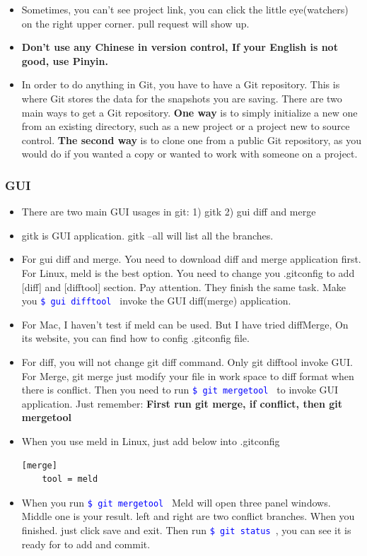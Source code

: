 \documentclass[a4paper,12pt,twoside]{book}
\newcommand{\linuxcommand}[1]{\texttt{\textcolor{blue}{\$ #1 \Pisymbol{psy}{191}}}}
\begin{document}
\begin{itemize}
\begin{itemize}
\begin{itemize}
    \item Sometimes, you can't see project link, you can click the little eye(watchers) on the right upper corner. pull request will show up.

\item \textbf{Don't use any Chinese in version control, If your English is not good, use
    Pinyin.}
    
\item In order to do anything in Git, you have to have a Git repository. This is where Git
    stores the data for the snapshots you are saving. There are two main ways to get a
    Git repository. \textbf{One way} is to simply initialize a new one from an existing
    directory, such as a new project or a project new to source control. \textbf{The
    second way} is to clone one from a public Git repository, as you would do if you
    wanted a copy or wanted to work with someone on a project.
\end{itemize}

\subsubsection{GUI}
\begin{itemize}
	\item There are two main GUI usages in git: 1) gitk 2) gui diff and merge    
    \item gitk is GUI application. gitk --all will list all the branches.
    \item For gui diff and merge.  You need to download diff and merge application first. For Linux, meld is the best option. You need to change you .gitconfig to add [diff] and [difftool] section. Pay attention. They finish the same task. Make you \linuxcommand{gui difftool} invoke the GUI diff(merge) application.  
       
      \item For Mac, I haven't test if meld can be used. But I have tried diffMerge, On its website, you can find how to config .gitconfig file.
      \item For diff, you will not change git diff command. Only git difftool invoke GUI. For Merge, git merge just modify your file in work space to diff format when there is conflict. Then you need to run \linuxcommand{git mergetool} to invoke GUI application.  Just remember: \textbf{First run git merge, if conflict, then git mergetool}
      \item When you use meld in Linux, just add below into .gitconfig 
\begin{verbatim}
[merge]
    tool = meld
\end{verbatim}
\item When you run \linuxcommand{git mergetool} Meld will open three panel windows. Middle one is your result. left and right are two conflict branches.  When you finished. just click save and exit. Then run \linuxcommand{git status}, you can see it is ready for to add and commit. 
 

\end{itemize}
\end{itemize}
\end{itemize}
\end{document}
